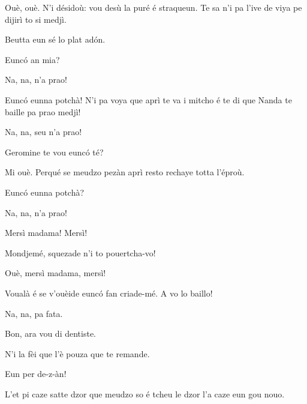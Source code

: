 \begin{drama}
\Casimirspeaks Ouè, ouè. N'i désidoù: vou desù la puré é straqueun. Te sa n’i pa l’ive de viya pe dijirì to si medjì.

\Fernandaspeaks Beutta eun sé lo plat ad\'on.


\Fernandaspeaks  Eunc\'o an mia?

\Casimirspeaks  Na, na, n'a prao!


\Fernandaspeaks Eunc\'o eunna potchà! N'i pa voya que aprì te va i mitcho é te di que Nanda te baille pa prao medjì!

\Casimirspeaks Na, na, seu n'a prao!

\Fernandaspeaks{} Geromine te vou eunc\'o té?

\Gerominespeaks Mi ouè. Perqué se meudzo pezàn aprì resto rechaye totta l'éproù.


\Fernandaspeaks  Eunc\'o eunna potchà?

\Gerominespeaks  Na, na, n'a prao!


\Fernandaspeaks{} Mersì madama! Mersì!


\Fernandaspeaks Mondjemé, squezade n'i to pouertcha-vo!

\Gerominespeaks{} Ouè, mersì madama, mersì!

\Fernandaspeaks Voualà é se v'ouèide eunc\'o fan criade-mé. A vo lo baillo!

\Gerominespeaks Na, na, pa fata.

\Fernandaspeaks Bon, ara vou di dentiste.

\Casimirspeaks N'i la fèi que l'è pouza que te remande.

\Fernandaspeaks  Eun per de-z-àn!


\Gerominespeaks L’et pi caze satte dzor que meudzo so é tcheu le dzor l’a caze eun gou nouo.


\end{drama}
